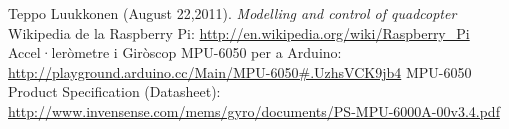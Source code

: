 \documentclass[twoside]{article}
\begin{document}
\newpage
\begin{thebibliography}{99}
 Teppo Luukkonen (August 22,2011). \textit{Modelling and control of quadcopter}
 Wikipedia de la Raspberry Pi: \url{http://en.wikipedia.org/wiki/Raspberry_Pi}
 Accel·leròmetre i Giròscop MPU-6050 per a Arduino: \url{http://playground.arduino.cc/Main/MPU-6050#.UzhsVCK9jb4}
 MPU-6050 Product Specification (Datasheet): \url{http://www.invensense.com/mems/gyro/documents/PS-MPU-6000A-00v3.4.pdf} 
\end{thebibliography}{}
\end{document}
